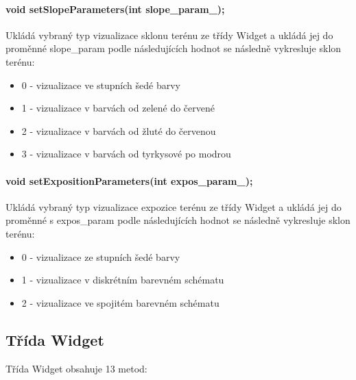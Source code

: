 \documentclass[11pt]{article}
\begin{document}
\paragraph {void setSlopeParameters(int slope\_param\_);}
Ukládá vybraný typ vizualizace sklonu terénu ze třídy Widget a ukládá jej do proměnné slope\_param podle následujících hodnot se následně vykresluje sklon terénu: 

\begin {itemize}
	\item 0 - vizualizace ve stupních šedé barvy
	\item 1 - vizualizace v barvách od zelené do červené
	\item 2 - vizualizace v barvách od žluté do červenou
	\item 3 - vizualizace v barvách od tyrkysové po modrou
\end {itemize}
  
\paragraph {void setExpositionParameters(int expos\_param\_);}
Ukládá vybraný typ vizualizace expozice terénu ze třídy Widget a ukládá jej do proměnné s expos\_param podle následujících hodnot se následně vykresluje sklon terénu: 

\begin{itemize}
	\item 0 - vizualizace ze stupních šedé barvy
	\item 1 - vizualizace v diskrétním barevném schématu
	\item 2 - vizualizace ve spojitém barevném schématu
\end{itemize}

\subsection{Třída Widget}
Třída Widget obsahuje 13 metod:
\end{document}
